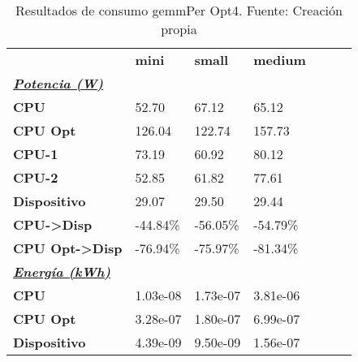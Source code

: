 \begin{table}[H]
    \centering
    \begin{tabular}{lllllll}
    \rowcolor[HTML]{DAE8FC} \ & \textbf{mini} & \textbf{	small} & \textbf{	medium} \\
    \cellcolor[HTML]{DAE8FC} \textbf{\textbf{{\emph{{\underline{{Potencia (W)}}}}}}} &  & 	 & 	 \\
    \rowcolor[HTML]{EFEFEF} \cellcolor[HTML]{DAE8FC} \textbf{CPU} & 52.70 & 	67.12 & 	65.12 \\
    \cellcolor[HTML]{DAE8FC} \textbf{CPU Opt} & 126.04 & 	122.74 & 	157.73 \\
    \rowcolor[HTML]{EFEFEF} \cellcolor[HTML]{DAE8FC} \textbf{\quad CPU-1} & 73.19 & 	60.92 & 	80.12 \\
    \cellcolor[HTML]{DAE8FC} \textbf{\quad CPU-2} & 52.85 & 	61.82 & 	77.61 \\
    \rowcolor[HTML]{EFEFEF} \cellcolor[HTML]{DAE8FC} \textbf{Dispositivo} & 29.07 & 	29.50 & 	29.44 \\
    \cellcolor[HTML]{DAE8FC} \textbf{CPU->Disp} & -44.84\% & 	-56.05\% & 	-54.79\% \\
    \rowcolor[HTML]{EFEFEF} \cellcolor[HTML]{DAE8FC} \textbf{CPU Opt->Disp} & -76.94\% & 	-75.97\% & 	-81.34\% \\
    \cellcolor[HTML]{DAE8FC} \textbf{\textbf{{\emph{{\underline{{Energía (kWh)}}}}}}} &  & 	 & 	 \\
    \rowcolor[HTML]{EFEFEF} \cellcolor[HTML]{DAE8FC} \textbf{CPU} & 1.03e-08 & 	1.73e-07 & 	3.81e-06 \\
    \cellcolor[HTML]{DAE8FC} \textbf{CPU Opt} & 3.28e-07 & 	1.80e-07 & 	6.99e-07 \\
    \rowcolor[HTML]{EFEFEF} \cellcolor[HTML]{DAE8FC} \textbf{Dispositivo} & 4.39e-09 & 	9.50e-09 & 	1.56e-07 \\
    \end{tabular}
    \caption[Resultados de consumo gemmPer Opt4]{{Resultados de consumo gemmPer Opt4. Fuente: Creación propia}}
    \label{table_test_gemmPer_Opt4_hw_powerResults}
\end{table}